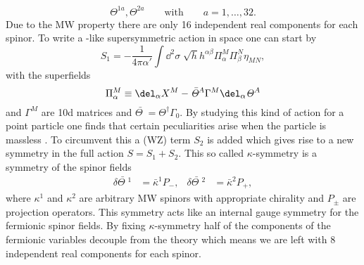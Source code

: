%
%
\begin{equation}
\mathit{\Theta}^{1a}, \mathit{\Theta}^{2a}\qquad \text{with} \qquad a=1,\ldots,32.
\end{equation}
%
%
Due to the MW property there are only 16 independent real components for each spinor. To write a -like supersymmetric action in   space one can start by 
%
%
\begin{equation}
S_{1} = -\frac{1}{4\pi\alpha'} \int \dd^{2}\sigma \; \sqrt{h}h^{\alpha\beta} \Pi^{M}_{\alpha}\Pi^{N}_{\beta} \eta_{MN},
\end{equation}
%
%
with the superfields
%
%
\begin{equation}
\Pi^{M}_{\alpha} \equiv \del_{\alpha}X^{M} - \bar{\mathit{\Theta}\;}\!\!^{A}\Gamma^{M}\del_{\alpha}\mathit{\Theta}^{A}
\label{eq: Pi_susy}
\end{equation}
%
%
and $\Gamma^{M}$ are 10d  matrices and $\bar{\mathit{\Theta}\;}\!\!=\mathit{\Theta}^{\dagger}\Gamma_{0}$. By studying this kind of action for a point particle one finds that certain peculiarities arise when the particle is massless \cite{Becker:2007zj}. To circumvent this a  (WZ) term $S_{2}$ is added which gives rise to a new symmetry in the full action $S=S_{1}+S_{2}$.  This so called $\kappa$-symmetry is a symmetry of the spinor fields
%
%
\begin{align}
\delta\bar{\mathit{\Theta}\;}\!\!^{1} &= \bar{\kappa}^{1}P_{-}, & \delta\bar{\mathit{\Theta}\;}\!\!^{2} &= \bar{\kappa}^{2}P_{+},
\end{align}
%
%
where $\kappa^{1}$ and $\kappa^{2}$ are arbitrary MW spinors with appropriate chirality and $P_{\pm}$ are projection operators. This symmetry acts like an internal gauge symmetry for the fermionic spinor fields. By fixing $\kappa$-symmetry half of the components of the fermionic variables decouple from the theory which means we are left with 8 independent real components for each spinor.
%
%
%
%
%
%
%
%
